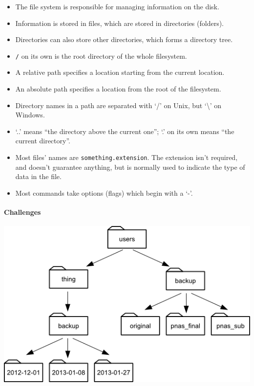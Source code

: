 \documentclass[]{book}
\begin{document}
\begin{itemize}
\item
  The file system is responsible for managing information on the disk.
\item
  Information is stored in files, which are stored in directories
  (folders).
\item
  Directories can also store other directories, which forms a directory
  tree.
\item
  \texttt{/} on its own is the root directory of the whole filesystem.
\item
  A relative path specifies a location starting from the current
  location.
\item
  An absolute path specifies a location from the root of the filesystem.
\item
  Directory names in a path are separated with `/' on Unix, but
  `\textbackslash{}' on Windows.
\item
  `..' means ``the directory above the current one''; `.' on its own
  means ``the current directory''.
\item
  Most files' names are \texttt{something.extension}. The extension
  isn't required, and doesn't guarantee anything, but is normally used
  to indicate the type of data in the file.
\item
  Most commands take options (flags) which begin with a `-'.
\end{itemize}

\mbox{}\paragraph{Challenges}

\includegraphics{novice/shell/img/filesystem-challenge.png}
\end{document}
